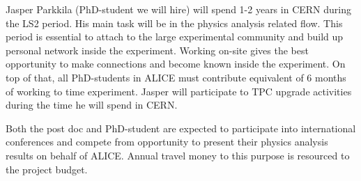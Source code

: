 Jasper Parkkila (PhD-student we will hire) will spend 1-2 years in CERN during the LS2 period. His main task will be in the physics analysis related flow. This period is essential to attach to the large experimental community and build up personal network inside the experiment. Working on-site gives the best opportunity to make connections and become known inside the experiment. On top of that, all PhD-students in ALICE must contribute equivalent of 6 months of working to time experiment. Jasper will participate to TPC upgrade activities during the time he will spend in CERN.

Both the post doc and PhD-student are expected to participate into international conferences and compete from opportunity to present their physics analysis results on behalf of ALICE. Annual travel money to this purpose is resourced to the project budget.

\nopagebreak
